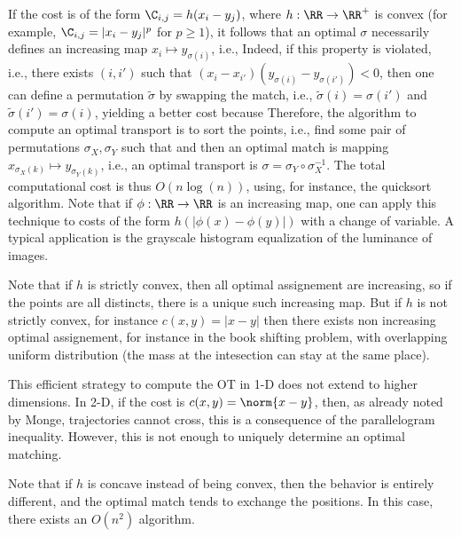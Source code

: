 If the cost is of the form $\C_{i,j}=h(x_i-y_j)$, where $h: \RR \rightarrow \RR^+$ is convex (for example, $\C_{i,j}=|x_i-y_j|^p$ for $p \geq 1$), it follows that an optimal $\sigma$ necessarily defines an increasing map $x_i \mapsto y_{\sigma(i)}$, i.e.,
Indeed, if this property is violated, i.e., there exists $(i,i')$ such that $(x_i-x_{i'})(y_{\sigma(i)}-y_{\sigma(i')}) < 0$, then one can define a permutation $\tilde{\sigma}$ by swapping the match, i.e., $\tilde{\sigma}(i)=\sigma(i')$ and $\tilde{\sigma}(i')=\sigma(i)$, yielding a better cost
because
Therefore, the algorithm to compute an optimal transport is to sort the points, i.e., find some pair of permutations $\sigma_X, \sigma_Y$ such that
and then an optimal match is mapping $x_{\sigma_X(k)} \mapsto y_{\sigma_Y(k)}$, i.e., an optimal transport is $\sigma = \sigma_Y \circ \sigma_X^{-1}$. The total computational cost is thus $O(n\log(n))$, using, for instance, the quicksort algorithm.
%
Note that if $\phi : \RR \rightarrow \RR$ is an increasing map, one can apply this technique to costs of the form $h(|\phi(x)-\phi(y)|)$ with a change of variable.
%
A typical application is the grayscale histogram equalization of the luminance of images.

Note that if $h$ is strictly convex, then all optimal assignement are increasing, so if the points are all distincts, there is a unique such increasing map. But if $h$ is not strictly convex, for instance $c(x,y)=|x-y|$ then there exists non increasing optimal assignement, for instance in the book shifting problem, with overlapping uniform distribution (the mass at the intesection can stay at the same place).

This efficient strategy to compute the OT in 1-D does not extend to higher dimensions. In 2-D, if the cost is $c(x,y) = \norm{x-y}$, then, as already noted by Monge, trajectories cannot cross, this is a consequence of the parallelogram inequality. However, this is not enough to uniquely determine an optimal matching. 

Note that if $h$ is concave instead of being convex, then the behavior is entirely different, and the optimal match tends to exchange the positions. In this case, there exists an $O(n^2)$ algorithm.


